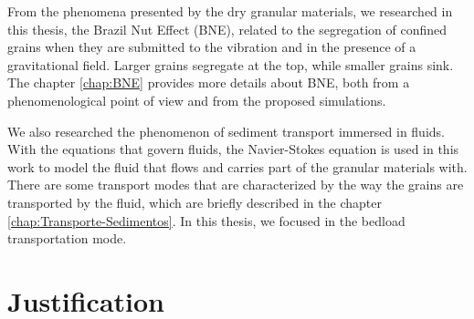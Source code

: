 
    From the phenomena presented by the dry granular materials, we researched in this thesis, the Brazil Nut Effect (BNE), related to the segregation of confined grains when they are submitted to the vibration and in the presence of a gravitational field. Larger grains segregate at the top, while smaller grains sink. The chapter \ref{chap:BNE} provides more details about BNE, both from a phenomenological point of view and from the proposed simulations.


    We also researched the phenomenon of sediment transport immersed in fluids. With the equations that govern fluids, the Navier-Stokes \cite{Physical_Hydrodynamics, Fluid_Mechanics} equation is used in this work to model the fluid that flows and carries part of the granular materials with. There are some transport modes that are characterized by the way the grains are transported by the fluid, which are briefly described in the chapter \ref{chap:Transporte-Sedimentos}. In this thesis, we focused in the bedload transportation mode.

\section{Justification}
\label{sec:justificativa}



